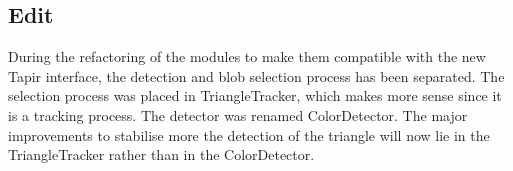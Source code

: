 \subsection{Edit}
\label{sec:ocd:edit}

During the refactoring of the modules to make them compatible with the 
new Tapir interface, the detection and blob selection process has been 
separated. The selection process was placed in TriangleTracker, 
which makes more sense since it is a tracking process. The detector was 
renamed ColorDetector. The major improvements to stabilise more the 
detection of the triangle will now lie in the TriangleTracker rather 
than in the ColorDetector.
